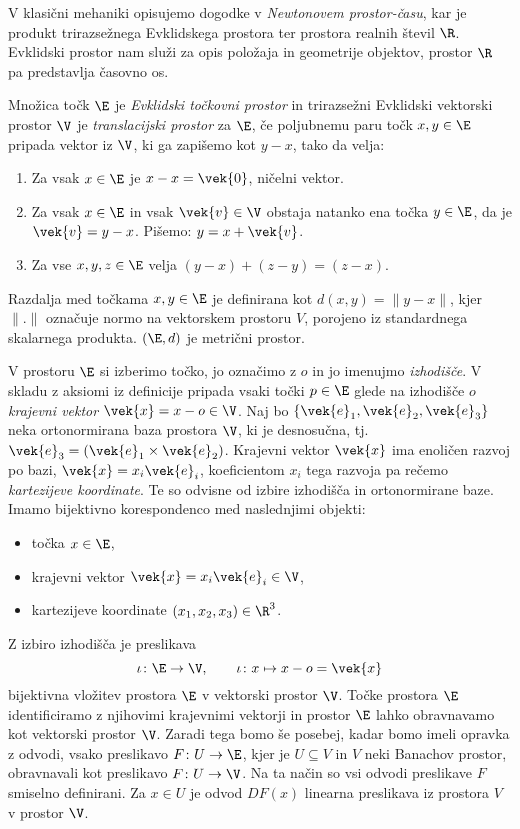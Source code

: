 V klasični mehaniki opisujemo dogodke v \emph{Newtonovem prostor-času}, kar je produkt
trirazsežnega Evklidskega prostora ter prostora realnih števil $\R$. Evklidski prostor nam služi
za opis položaja in geometrije objektov, prostor $\R$ pa predstavlja časovno os.

\begin{definicija} \label{d:ep}
	Množica točk $\E$ je \emph{Evklidski točkovni prostor} in trirazsežni Evklidski vektorski prostor $\V$ je
	\emph{translacijski prostor} za $\E$, če poljubnemu paru točk $x,y\in\E$ pripada vektor iz $\V$,
	ki ga zapišemo kot $y-x$, tako da velja:
	\begin{enumerate}
		\item Za vsak $x\in\E$ je $x-x=\vek{0}$, ničelni vektor.
		\item Za vsak $x\in\E$ in vsak $\vek{v}\in\V$ obstaja natanko ena točka $y\in\E$, da je
		$\vek{v}=y-x$. Pišemo: $y=x+\vek{v}$.
		\item Za vse $x,y,z\in\E$ velja $(y-x)+(z-y)=(z-x)$.
	\end{enumerate}
\end{definicija}

Razdalja med točkama $x,y\in\E$ je definirana kot $d(x,y)=\|y-x\|$, kjer $\|.\|$ označuje normo na
vektorskem prostoru $V$, porojeno iz standardnega skalarnega produkta. $(\E,d)$ je metrični prostor.

V prostoru $\E$ si izberimo točko, jo označimo z $o$ in jo imenujmo \emph{izhodišče}.
V skladu z aksiomi iz definicije pripada vsaki točki $p\in\E$ glede na izhodišče $o$ \emph{krajevni vektor}
$\vek{x}=x-o\in \V$. Naj bo $\{\vek{e}_1,\vek{e}_2,\vek{e}_3\}$ neka ortonormirana baza prostora $\V$,
ki je desnosučna, tj.~$\vek{e}_3=(\vek{e}_1\times\vek{e}_2)$. Krajevni vektor $\vek{x}$
ima enoličen razvoj po bazi, $\vek{x}=x_i\vek{e}_i$, koeficientom $x_i$ tega razvoja pa rečemo
\emph{kartezijeve koordinate}. Te so odvisne od izbire izhodišča in ortonormirane baze.
Imamo bijektivno korespondenco med naslednjimi objekti:
\begin{itemize}
	\item točka $x\in\E$,
	\item krajevni vektor $\vek{x}=x_i\vek{e}_i\in \V$,
	\item kartezijeve koordinate $(x_1,x_2,x_3)\in\R^3$.
\end{itemize}

Z izbiro izhodišča je preslikava
\[
	\iota\colon\E\to\V,\qquad\iota\colon x\mapsto x-o=\vek{x}
\]
bijektivna vložitev prostora $\E$ v vektorski prostor $\V$. Točke
prostora $\E$ identificiramo z njihovimi krajevnimi vektorji in prostor $\E$
lahko obravnavamo kot vektorski prostor $\V$. Zaradi tega bomo še posebej, kadar bomo imeli opravka
z odvodi, vsako preslikavo $F\colon U\to \E$, kjer je $U\subseteq V$ in $V$ neki Banachov prostor,
obravnavali kot preslikavo $F\colon U\to\V$. Na ta način so vsi odvodi preslikave $F$
smiselno definirani. Za $x\in U$ je odvod $DF(x)$ linearna preslikava iz prostora $V$ v prostor $\V$.

